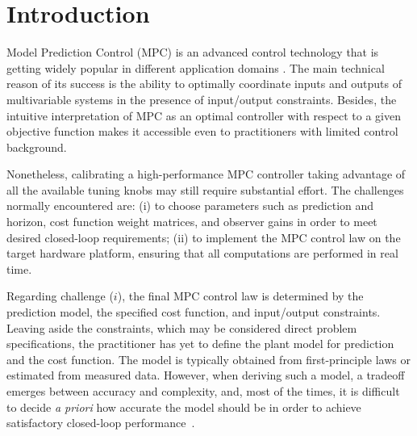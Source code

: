 \documentclass{article}
\begin{document}
\section{Introduction}
Model Prediction Control (MPC) is an advanced control technology that is getting widely popular in different application
domains \citep{borrelli2017predictive}.
The main technical reason of its success is the ability to optimally coordinate inputs and outputs of  multivariable systems in the presence of input/output constraints. 
Besides, the intuitive interpretation of MPC as an optimal controller with respect to a given objective function makes it accessible even to practitioners with limited control  background. 

Nonetheless, calibrating a high-performance MPC controller taking advantage of all the available tuning knobs may still require substantial effort. The challenges normally encountered are: (i) to choose parameters such as prediction and horizon, cost function weight matrices, and observer gains in order to meet desired closed-loop requirements; (ii) to implement the MPC control law on the target hardware platform, ensuring that all computations are performed in real time.

Regarding challenge ($i$),  the final MPC control law is determined by the prediction model, the specified  cost function, and input/output constraints. 
Leaving  aside the constraints, which may be considered direct problem specifications, the practitioner has yet to define the plant model for prediction and the cost function. The model is typically obtained from first-principle laws or estimated from measured data. However, when deriving such a model, a tradeoff emerges between accuracy and complexity, and, most of the times, it is difficult  to decide \emph{a priori} how accurate the model should be in order to achieve  satisfactory closed-loop performance~\citep{FoPiToSa2016,PiFoBe2017}. 
% 
\end{document}

